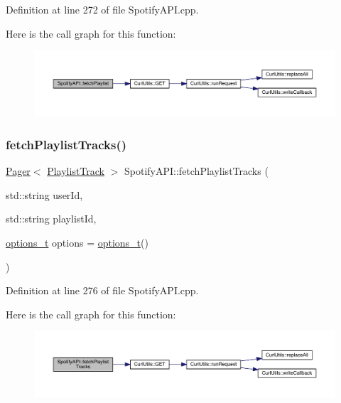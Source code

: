 Definition at line 272 of file Spotify\+A\+P\+I.\+cpp.

Here is the call graph for this function\+:
\nopagebreak
\begin{figure}[H]
\begin{center}
\leavevmode
\includegraphics[width=350pt]{class_spotify_a_p_i_a1d4dc0e62ce453938965fcbd4d6ddf8c_cgraph}
\end{center}
\end{figure}
\mbox{\label{class_spotify_a_p_i_a0093e71746beb4cae5cafec78db45267}} 
\subsubsection{\texorpdfstring{fetch\+Playlist\+Tracks()}{fetchPlaylistTracks()}}
{\footnotesize\ttfamily \mbox{\hyperlink{class_pager}{Pager}}$<$ \mbox{\hyperlink{class_playlist_track}{Playlist\+Track}} $>$ Spotify\+A\+P\+I\+::fetch\+Playlist\+Tracks (\begin{DoxyParamCaption}\item[{std\+::string}]{user\+Id,  }\item[{std\+::string}]{playlist\+Id,  }\item[{\mbox{\hyperlink{_spotify_a_p_i_8h_a0ff5cac1a4007bb330b7d9939650c283}{options\+\_\+t}}}]{options = {\ttfamily \mbox{\hyperlink{_spotify_a_p_i_8h_a0ff5cac1a4007bb330b7d9939650c283}{options\+\_\+t}}()} }\end{DoxyParamCaption})}



Definition at line 276 of file Spotify\+A\+P\+I.\+cpp.

Here is the call graph for this function\+:
\nopagebreak
\begin{figure}[H]
\begin{center}
\leavevmode
\includegraphics[width=350pt]{class_spotify_a_p_i_a0093e71746beb4cae5cafec78db45267_cgraph}
\end{center}
\end{figure}
\mbox{\label{class_spotify_a_p_i_a22c839c61fa06ac212d1c38a0ca5cd2f}} 
